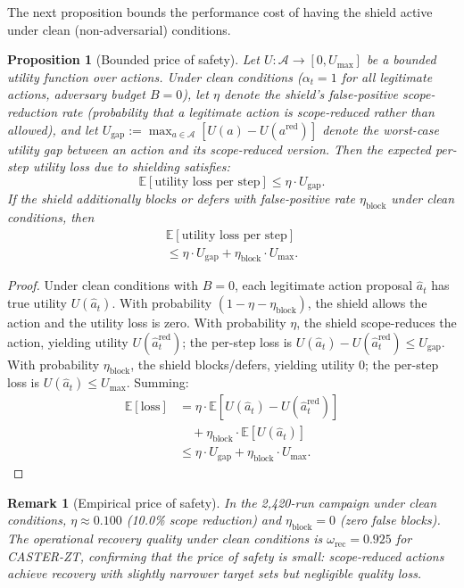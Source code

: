 \documentclass[10pt,journal,compsoc]{IEEEtran}
\newtheorem{proposition}{Proposition}
\newtheorem{remark}{Remark}
\begin{document}
The next proposition bounds the performance cost of having the shield active under clean (non-adversarial) conditions.

\begin{proposition}[Bounded price of safety]
\label{prop:price_safety}
Let $U: \mathcal{A} \to [0, U_{\max}]$ be a bounded utility function over actions.
Under clean conditions ($\alpha_t = 1$ for all legitimate actions, adversary budget $B = 0$), let $\eta$ denote the shield's false-positive scope-reduction rate (probability that a legitimate action is scope-reduced rather than allowed), and let $U_{\mathrm{gap}} := \max_{a \in \mathcal{A}} [U(a) - U(a^{\mathrm{red}})]$ denote the worst-case utility gap between an action and its scope-reduced version.
Then the expected per-step utility loss due to shielding satisfies:
\[
\mathbb{E}[\text{utility loss per step}] \le \eta \cdot U_{\mathrm{gap}}.
\]
If the shield additionally blocks or defers with false-positive rate $\eta_{\mathrm{block}}$ under clean conditions, then
\begin{multline*}
\mathbb{E}[\text{utility loss per step}] \\
\le \eta \cdot U_{\mathrm{gap}} + \eta_{\mathrm{block}} \cdot U_{\max}.
\end{multline*}
\end{proposition}
\begin{proof}
Under clean conditions with $B=0$, each legitimate action proposal $\hat{a}_t$ has true utility $U(\hat{a}_t)$.
With probability $(1-\eta-\eta_{\mathrm{block}})$, the shield allows the action and the utility loss is zero.
With probability $\eta$, the shield scope-reduces the action, yielding utility $U(\hat{a}_t^{\mathrm{red}})$; the per-step loss is $U(\hat{a}_t) - U(\hat{a}_t^{\mathrm{red}}) \le U_{\mathrm{gap}}$.
With probability $\eta_{\mathrm{block}}$, the shield blocks/defers, yielding utility 0; the per-step loss is $U(\hat{a}_t) \le U_{\max}$.
Summing:
\begin{align*}
\mathbb{E}[\text{loss}] &= \eta \!\cdot\! \mathbb{E}[U(\hat{a}_t) - U(\hat{a}_t^{\mathrm{red}})]\\
&\quad + \eta_{\mathrm{block}} \!\cdot\! \mathbb{E}[U(\hat{a}_t)]\\
&\le \eta \cdot U_{\mathrm{gap}} + \eta_{\mathrm{block}} \cdot U_{\max}.
\end{align*}
\end{proof}

\begin{remark}[Empirical price of safety]
In the 2,420-run campaign under clean conditions, $\eta \approx 0.100$ (10.0\% scope reduction) and $\eta_{\mathrm{block}} = 0$ (zero false blocks).
The operational recovery quality under clean conditions is $\omega_{\mathrm{rec}} = 0.925$ for CASTER-ZT, confirming that the price of safety is small: scope-reduced actions achieve recovery with slightly narrower target sets but negligible quality loss.
\end{remark}
\end{document}
